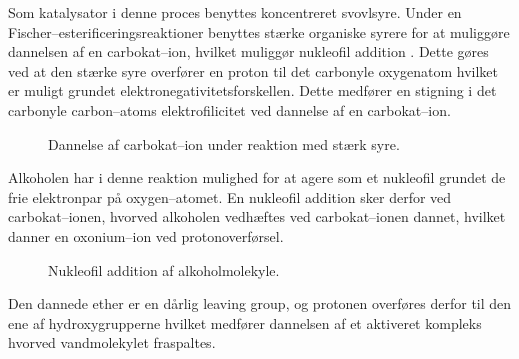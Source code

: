     Som katalysator i denne proces benyttes koncentreret svovlsyre. Under en Fischer--esterificeringsreaktioner benyttes stærke organiske syrere for at muliggøre dannelsen af en carbokat--ion, hvilket muliggør nukleofil addition \parencite{Stev2023}. Dette gøres ved at den stærke syre overfører en proton til det carbonyle oxygenatom hvilket er muligt grundet elektronegativitetsforskellen. Dette medfører en stigning i det carbonyle carbon--atoms elektrofilicitet ved dannelse af en carbokat--ion.
    \begin{figure}[H]
        \caption{Dannelse af carbokat--ion under reaktion med stærk syre.}
    \end{figure}
    Alkoholen har i denne reaktion mulighed for at agere som et nukleofil grundet de frie elektronpar på oxygen--atomet. En nukleofil addition sker derfor ved carbokat--ionen, hvorved alkoholen vedhæftes ved carbokat--ionen dannet, hvilket danner en oxonium--ion ved protonoverførsel.
    \begin{figure}[H]
        \caption{Nukleofil addition af alkoholmolekyle.}
    \end{figure}
    Den dannede ether er en dårlig leaving group, og protonen overføres derfor til den ene af hydroxygrupperne hvilket medfører dannelsen af et aktiveret kompleks hvorved vandmolekylet fraspaltes. 
